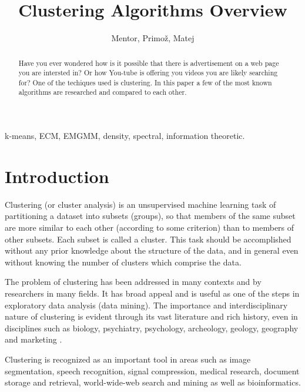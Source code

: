 \documentclass[conference]{IEEEtran}
\begin{document}
\title{Clustering Algorithms Overview}
\author{Mentor, Primož, Matej}
\maketitle

\begin{abstract}
Have you ever wondered how is it possible that there is advertisement on a web page you
are intersted in? Or how You-tube is offering you videos you are likely searching for? 
One of the techiques used is clustering. In this paper a few of the most known
algorithms are researched and compared to each other.
\end{abstract}

\begin{IEEEkeywords}
k-means, ECM, EMGMM, density, spectral, information theoretic.
\end{IEEEkeywords}

\section{Introduction}
Clustering (or cluster analysis) is an unsupervised machine learning task of partitioning
a dataset into subsets (groups), so that members of the same subset are more similar to each other
(according to some criterion) than to members of other subsets. Each subset is called a cluster.
This task should be accomplished without any prior knowledge about the structure of the data, and in general
even without knowing the number of clusters which comprise the data.

The problem of clustering has been addressed in many contexts and by researchers in many fields. It has
broad appeal and is useful as one of the steps in exploratory data analysis (data mining). The importance
and interdisciplinary nature of clustering is evident through its vast literature and rich history, even
in disciplines such as biology, psychiatry, psychology, archeology, geology, geography and
marketing \cite{jaindubes88}.%

Clustering is recognized as an important tool in areas such as image segmentation,
speech recognition, signal compression, medical research, document storage and retrieval,
world-wide-web search and mining as well as bioinformatics.
\end{document}
